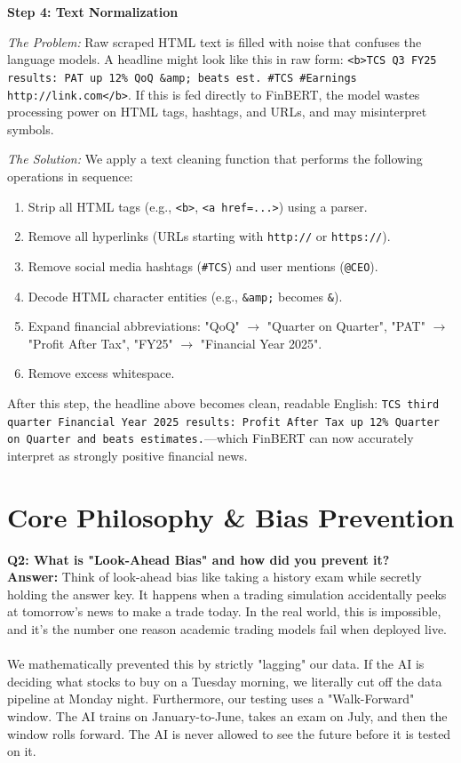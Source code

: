 \documentclass[11pt, a4paper]{article}
\begin{document}
\vspace{0.5em}
\textbf{Step 4: Text Normalization}

\textit{The Problem:} Raw scraped HTML text is filled with noise that confuses the language models. A headline might look like this in raw form: \texttt{<b>TCS Q3 FY25 results: PAT up 12\% QoQ \&amp; beats est. \#TCS \#Earnings http://link.com</b>}. If this is fed directly to FinBERT, the model wastes processing power on HTML tags, hashtags, and URLs, and may misinterpret symbols.

\textit{The Solution:} We apply a text cleaning function that performs the following operations in sequence:
\begin{enumerate}[noitemsep]
    \item Strip all HTML tags (e.g., \texttt{<b>}, \texttt{<a href=...>}) using a parser.
    \item Remove all hyperlinks (URLs starting with \texttt{http://} or \texttt{https://}).
    \item Remove social media hashtags (\texttt{\#TCS}) and user mentions (\texttt{@CEO}).
    \item Decode HTML character entities (e.g., \texttt{\&amp;} becomes \texttt{\&}).
    \item Expand financial abbreviations: "QoQ" $\rightarrow$ "Quarter on Quarter", "PAT" $\rightarrow$ "Profit After Tax", "FY25" $\rightarrow$ "Financial Year 2025".
    \item Remove excess whitespace.
\end{enumerate}
After this step, the headline above becomes clean, readable English: \texttt{TCS third quarter Financial Year 2025 results: Profit After Tax up 12\% Quarter on Quarter and beats estimates.}—which FinBERT can now accurately interpret as strongly positive financial news.

\section*{Core Philosophy \& Bias Prevention}

\textbf{\textcolor{IITBlue}{Q2: What is "Look-Ahead Bias" and how did you prevent it?}} \\
\textbf{Answer:} Think of look-ahead bias like taking a history exam while secretly holding the answer key. It happens when a trading simulation accidentally peeks at tomorrow's news to make a trade today. In the real world, this is impossible, and it's the number one reason academic trading models fail when deployed live.
\\ \\
We mathematically prevented this by strictly "lagging" our data. If the AI is deciding what stocks to buy on a Tuesday morning, we literally cut off the data pipeline at Monday night. Furthermore, our testing uses a "Walk-Forward" window. The AI trains on January-to-June, takes an exam on July, and then the window rolls forward. The AI is never allowed to see the future before it is tested on it.
\end{document}
